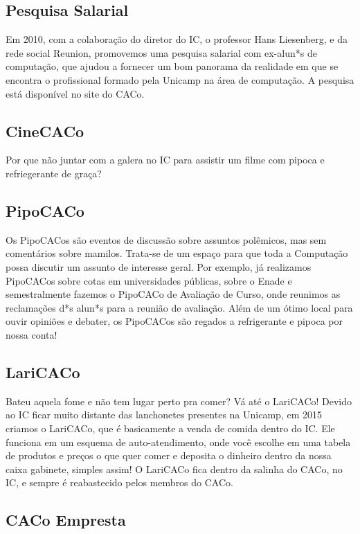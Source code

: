 \subsection{Pesquisa Salarial}

Em 2010, com a colaboração do diretor do IC, o professor Hans Liesenberg, e da
rede social Reunion, promovemos uma pesquisa salarial com ex-alun*s de
computação, que ajudou a fornecer um bom panorama da realidade em que se
encontra o profissional formado pela Unicamp na área de computação. A pesquisa
está disponível no site do CACo.

\subsection{CineCACo}

Por que não juntar com a galera no IC para assistir um filme com pipoca e
refriegerante de graça?

\subsection{PipoCACo}

Os PipoCACos são eventos de discussão sobre assuntos polêmicos, mas sem
comentários sobre mamilos. Trata-se de um espaço para que toda a Computação
possa discutir um assunto de interesse geral. Por exemplo, já realizamos
PipoCACos sobre cotas em universidades públicas, sobre o Enade e semestralmente
fazemos o PipoCACo de Avaliação de Curso, onde reunimos as reclamações d*s
alun*s para a reunião de avaliação. Além de um ótimo local para ouvir opiniões e
debater, os PipoCACos são regados a refrigerante e pipoca por nossa conta!

\subsection{LariCACo}

Bateu aquela fome e não tem lugar perto pra comer? Vá até o LariCACo!  Devido ao
IC ficar muito distante das lanchonetes presentes na Unicamp, em 2015 criamos o
LariCACo, que é basicamente a venda de comida dentro do IC. Ele funciona em um
esquema de auto-atendimento, onde você escolhe em uma tabela de produtos e
preços o que quer comer e deposita o dinheiro dentro da nossa caixa gabinete,
simples assim! O LariCACo fica dentro da salinha do CACo, no IC, e sempre é
reabastecido pelos membros do CACo.

\subsection{CACo Empresta}

